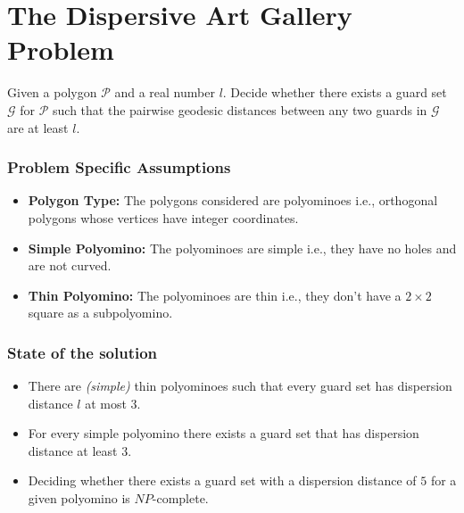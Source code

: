 \documentclass{Assignment}
\begin{document}
\section*{The Dispersive Art Gallery Problem\supercite{dispersive_art_gallery}}
\begin{problem}
    Given a polygon $\mathcal{P}$ and a real number $l$. Decide whether there exists a guard set $\mathcal{G}$ for $\mathcal{P}$ such that the pairwise geodesic distances between any two guards in $\mathcal{G}$ are at least $l$.
\end{problem}
\vspace{-0.8cm}
\subsubsection*{Problem Specific Assumptions}
\vspace{-0.3cm}
\begin{itemize}
    \itemsep-0.3em
    \item \textbf{Polygon Type:} The polygons considered are polyominoes i.e., orthogonal polygons whose vertices have integer coordinates.
    \item \textbf{Simple Polyomino:} The polyominoes are simple i.e., they have no holes and are not curved.
    \item \textbf{Thin Polyomino:} The polyominoes are thin i.e., they don't have a $2 \times 2$ square as a subpolyomino.
\end{itemize}
\vspace{-0.8cm}
\subsubsection*{State of the solution}
\vspace{-0.3cm}
\begin{itemize}
    \itemsep-0.3em
    \item There are \textit{(simple)} thin polyominoes such that every guard set has dispersion distance $l$ at most $3$.
    \item For every simple polyomino there exists a guard set that has dispersion distance at least $3$.
    \item Deciding whether there exists a guard set with a dispersion distance of $5$ for a given polyomino is $NP$-complete.
\end{itemize}
\vspace{-0.8cm}
\end{document}
